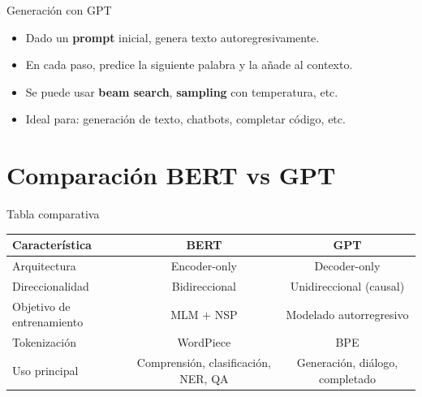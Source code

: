 \documentclass[aspectratio=169, 10pt, xcolor=table]{beamer}
\begin{document}
\begin{frame}{Generación con GPT}
    \begin{itemize}
        \item Dado un \textbf{prompt} inicial, genera texto autoregresivamente.
        \item En cada paso, predice la siguiente palabra y la añade al contexto.
        \item Se puede usar \textbf{beam search}, \textbf{sampling} con temperatura, etc.
        \item Ideal para: generación de texto, chatbots, completar código, etc.
    \end{itemize}
\end{frame}

\section{Comparación BERT vs GPT}

\begin{frame}{Tabla comparativa}
    \begin{table}
        \centering
        \begin{tabular}{l|c|c}
            \toprule
            \textbf{Característica} & \textbf{BERT} & \textbf{GPT} \\
            \midrule
            Arquitectura & Encoder-only & Decoder-only \\
            Direccionalidad & Bidireccional & Unidireccional (causal) \\
            Objetivo de entrenamiento & MLM + NSP & Modelado autorregresivo \\
            Tokenización & WordPiece & BPE \\
            Uso principal & Comprensión, clasificación, NER, QA & Generación, diálogo, completado \\
            \bottomrule
        \end{tabular}
    \end{table}
\end{frame}

\end{document}
